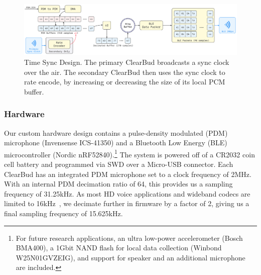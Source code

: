 \documentclass [11pt, proquest] {uwthesis}[2020/02/24]
\begin{document}
\begin{figure}
\vskip -0.1in
\centering
\includegraphics[width=0.85\linewidth]{CB_figures/mic-pipeline-2.png}
\vskip -0.1in
\caption{Time Sync Design. The primary ClearBud broadcasts a sync clock over the air. The secondary ClearBud then uses the sync clock to rate encode, by increasing or decreasing the size of its local PCM buffer.}%
\label{fig:sync}
\vskip -0.15in
\end{figure}


\subsubsection{Hardware}  Our  custom hardware design contains  a %
pulse-density modulated (PDM) microphone (Invensense ICS-41350) and a Bluetooth Low Energy (BLE) microcontroller (Nordic nRF52840).\footnote{For future research applications, an ultra low-power accelerometer (Bosch BMA400), a 1Gbit NAND flash for local data collection (Winbond W25N01GVZEIG), and support for speaker and an additional microphone are included.} The system is powered off of a CR2032 coin cell battery and programmed via SWD over a Micro-USB connector.  Each ClearBud has an integrated PDM microphone set to a clock frequency of 2MHz. With an internal PDM decimation ratio of 64, this provides us a sampling frequency of 31.25kHz. As most HD voice applications and wideband codecs are limited to 16kHz~\cite{voicecodecs}, we decimate further in firmware by a factor of 2, giving us a final sampling frequency of 15.625kHz.
\end{document}
